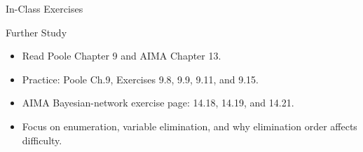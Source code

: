 \documentclass[aspectratio=169]{beamer}
\begin{document}
\begin{frame}{In-Class Exercises}
\end{frame}

\begin{frame}{Further Study}
\begin{itemize}
  \item Read Poole Chapter 9 and AIMA Chapter 13.
  \item Practice: Poole Ch.9, Exercises 9.8, 9.9, 9.11, and 9.15.
  \item AIMA Bayesian-network exercise page: 14.18, 14.19, and 14.21.
  \item Focus on enumeration, variable elimination, and why elimination order affects difficulty.
\end{itemize}
\end{frame}
\end{document}
